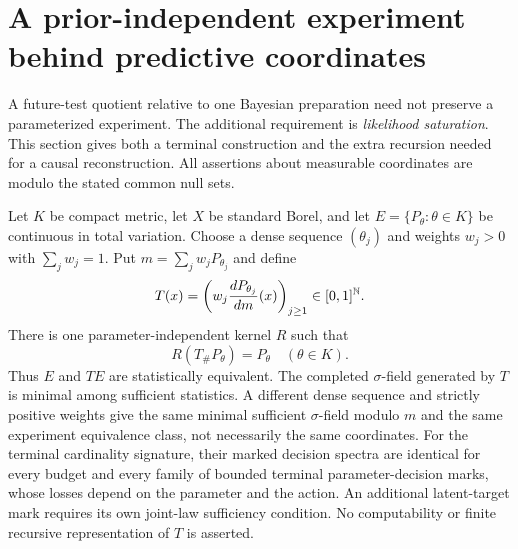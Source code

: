 \section{A prior-independent experiment behind predictive coordinates}
\label{sec:v8-sufficiency}
A future-test quotient relative to one Bayesian preparation need not
preserve a parameterized experiment. The additional requirement is
\emph{likelihood saturation}. This section gives both a terminal
construction and the extra recursion needed for a causal reconstruction.
All assertions about measurable coordinates are modulo the stated common
null sets.

\begin{theorem}\label{thm:v8-sufficient}
Let $K$ be compact metric, let $X$ be standard Borel, and let
$E=\{P_\theta:\theta\in K\}$ be continuous in total variation.
Choose a dense sequence $(\theta_j)$ and weights $w_j>0$ with
$\sum_jw_j=1$. Put $m=\sum_jw_jP_{\theta_j}$ and define
\begin{equation}
 T(x)=\left(w_j\frac{dP_{\theta_j}}{dm}(x)\right)_{j\ge1}
       \in[0,1]^{\mathbb N}.                                \label{eq:v8-posteriorcoordinate}
\end{equation}
There is one parameter-independent kernel $R$ such that
\begin{equation}
                      R(T_\#P_\theta)=P_\theta
                      \quad(\theta\in K).            \label{eq:v8-sufficientreconstruction}
\end{equation}
Thus $E$ and $TE$ are statistically equivalent. The completed
$\sigma$-field generated by $T$ is minimal among sufficient statistics.
A different dense sequence and strictly positive weights give the same
minimal sufficient $\sigma$-field modulo $m$ and the same experiment
equivalence class, not necessarily the same coordinates.
For the terminal cardinality signature, their marked decision spectra
are identical for every budget and every family of bounded terminal
parameter-decision marks, whose losses depend on the parameter and the
action. An additional latent-target mark requires its own joint-law
sufficiency condition. No computability or finite recursive representation of $T$ is
asserted.
\end{theorem}
